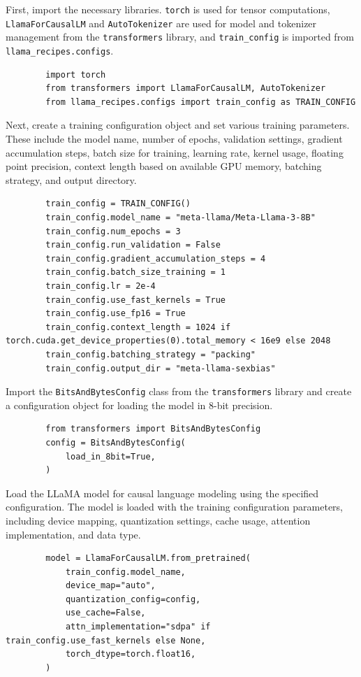 \documentclass{solutionclass} %
\begin{document}
\begin{solution}
	First, import the necessary libraries. \texttt{torch} is used for tensor computations, \texttt{LlamaForCausalLM} and \texttt{AutoTokenizer} are used for model and tokenizer management from the \texttt{transformers} library, and \texttt{train\_config} is imported from \texttt{llama\_recipes.configs}.
	\begin{lstlisting}
		import torch
		from transformers import LlamaForCausalLM, AutoTokenizer
		from llama_recipes.configs import train_config as TRAIN_CONFIG
	\end{lstlisting}
\end{solution}

\begin{solution}
	Next, create a training configuration object and set various training parameters. These include the model name, number of epochs, validation settings, gradient accumulation steps, batch size for training, learning rate, kernel usage, floating point precision, context length based on available GPU memory, batching strategy, and output directory.
	\begin{lstlisting}
		train_config = TRAIN_CONFIG()
		train_config.model_name = "meta-llama/Meta-Llama-3-8B"
		train_config.num_epochs = 3
		train_config.run_validation = False
		train_config.gradient_accumulation_steps = 4
		train_config.batch_size_training = 1
		train_config.lr = 2e-4
		train_config.use_fast_kernels = True
		train_config.use_fp16 = True
		train_config.context_length = 1024 if torch.cuda.get_device_properties(0).total_memory < 16e9 else 2048
		train_config.batching_strategy = "packing"
		train_config.output_dir = "meta-llama-sexbias"
	\end{lstlisting}
\end{solution}

\begin{solution}
	Import the \texttt{BitsAndBytesConfig} class from the \texttt{transformers} library and create a configuration object for loading the model in 8-bit precision.
	\begin{lstlisting}
		from transformers import BitsAndBytesConfig
		config = BitsAndBytesConfig(
			load_in_8bit=True,
		)
	\end{lstlisting}
\end{solution}

\begin{solution}
	Load the LLaMA model for causal language modeling using the specified configuration. The model is loaded with the training configuration parameters, including device mapping, quantization settings, cache usage, attention implementation, and data type.
	\begin{lstlisting}
		model = LlamaForCausalLM.from_pretrained(
            train_config.model_name,
            device_map="auto",
            quantization_config=config,
            use_cache=False,
            attn_implementation="sdpa" if train_config.use_fast_kernels else None,
            torch_dtype=torch.float16,
        )
	\end{lstlisting}
\end{solution}
\end{document}
